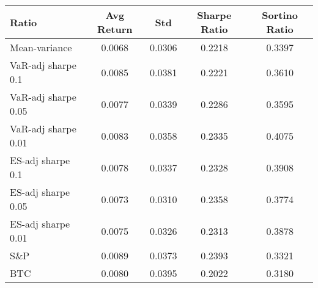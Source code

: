 \begin{tabular}{lcccc}
\toprule
Ratio & Avg Return & Std & Sharpe Ratio & Sortino Ratio\\
\midrule
Mean-variance & 0.0068 & 0.0306 & 0.2218 & 0.3397\\
VaR-adj sharpe 0.1 & 0.0085 & 0.0381 & 0.2221 & 0.3610\\
VaR-adj sharpe 0.05 & 0.0077 & 0.0339 & 0.2286 & 0.3595\\
VaR-adj sharpe 0.01 & 0.0083 & 0.0358 & 0.2335 & 0.4075\\
ES-adj sharpe 0.1 & 0.0078 & 0.0337 & 0.2328 & 0.3908\\
ES-adj sharpe 0.05 & 0.0073 & 0.0310 & 0.2358 & 0.3774\\
ES-adj sharpe 0.01 & 0.0075 & 0.0326 & 0.2313 & 0.3878\\
S\&P & 0.0089 & 0.0373 & 0.2393 & 0.3321\\
BTC & 0.0080 & 0.0395 & 0.2022 & 0.3180\\
\bottomrule
\end{tabular}
